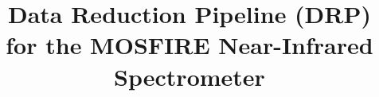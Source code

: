 \documentclass[a4paper]{article}
\begin{document}
\title{Data Reduction Pipeline (DRP) for the MOSFIRE Near-Infrared Spectrometer}



\maketitle









%
%

%
\end{document}
